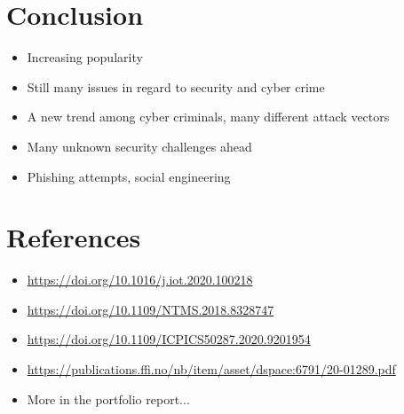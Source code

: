 \section{Conclusion}
\begin{frame}{\insertsection}
    \begin{itemize}
        \item Increasing popularity
        \item Still many issues in regard to security and cyber crime
        \item A new trend among cyber criminals, many different attack vectors
        \item Many unknown security challenges ahead
        \item Phishing attempts, social engineering
    \end{itemize}
\end{frame}

\section{References}
\begin{frame}{\insertsection}
    \begin{itemize}
        \item \url{https://doi.org/10.1016/j.iot.2020.100218}
        \item \url{https://doi.org/10.1109/NTMS.2018.8328747}
        \item \url{https://doi.org/10.1109/ICPICS50287.2020.9201954}
        \item \url{https://publications.ffi.no/nb/item/asset/dspace:6791/20-01289.pdf}
        \vspace{0.5cm}
        \item More in the portfolio report...
    \end{itemize}
\end{frame}
